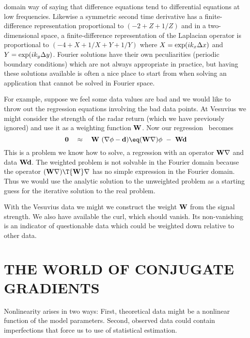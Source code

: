 domain way of saying that difference equations tend to differential equations at low 
frequencies. Likewise a symmetric second time derivative has a finite-difference 
representation proportional to $(-2+Z+1/Z)$ and in a two-dimensional space, a 
finite-difference representation of the Laplacian operator is proportional to $(-4+X+1/X+Y+1/Y)$ where $X = {\rm exp}(i k_x \Delta x )$ and $Y = {\rm exp}(i k_y \Delta y )$. 
Fourier solutions have their own peculiarities (periodic boundary conditions) 
which are not always appropriate in practice, but having these solutions available 
is often a nice place to start from when solving an application that cannot be solved 
in Fourier space.

\par
For example, suppose we feel some data values are bad and we
would like to throw out the regression equations involving the bad data points. At 
Vesuvius we might consider the strength of the radar return (which we have
previously ignored) and use it as a weighting function ${\bf W}$.
Now our regression~\label{eqn:analyticsolution} becomes 
\begin{equation}
{\bf 0} \quad \approx\quad
{\bf W} \ (\nabla \phi -{\bf d})
\eq ({\bf W} \nabla) \phi \ -\  {\bf Wd}
\end{equation}
This is a problem we know how to solve,
a regression with an operator ${\bf W \nabla}$  and 
data ${\bf Wd}$. The weighted problem is not solvable in the Fourier domain because 
the operator $({\bf W} \nabla )\T {\bf W} \nabla$ has no simple expression in the Fourier domain. Thus we would use the analytic solution to the unweighted problem as a starting guess for 
the iterative solution to the real problem. 
\par
With the Vesuvius data we might we construct the weight ${\bf W}$ from the signal 
strength. We also have available the curl, which should vanish. Its non-vanishing 
is an indicator of questionable data which could be weighted down relative to other 
data.

\section{THE WORLD OF CONJUGATE GRADIENTS}

Nonlinearity arises in two ways:
First, theoretical data might be a nonlinear function of the model parameters.
Second, observed data could contain imperfections that force us to use
 of statistical estimation.

